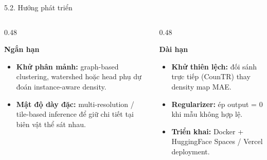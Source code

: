 \documentclass[11pt]{beamer}
\begin{document}
\begin{frame}{5.2. Hướng phát triển}
\scriptsize

\begin{columns}[T,onlytextwidth]

\begin{column}{0.48\textwidth}
\begin{block}{\textbf{Ngắn hạn}}
\begin{itemize}\setlength{\itemsep}{2pt}
  \item \textbf{Khử phân mảnh:} graph-based clustering, watershed hoặc head phụ dự đoán instance-aware density.
  \item \textbf{Mật độ dày đặc:} multi-resolution / tile-based inference để giữ chi tiết tại biên vật thể sát nhau.
    
\end{itemize}
\end{block}
\end{column}

\begin{column}{0.48\textwidth}
\begin{block}{\textbf{Dài hạn}}
\begin{itemize}\setlength{\itemsep}{2pt}
  \item \textbf{Khử thiên lệch:} đối sánh trực tiếp (CounTR) thay density map MAE.
  \item \textbf{Regularizer:} ép output = 0 khi mẫu không hợp lệ.
  \item \textbf{Triển khai:} Docker + HuggingFace Spaces / Vercel deployment.
\end{itemize}
\end{block}
\end{column}

\end{columns}

\end{frame}
\end{document}
